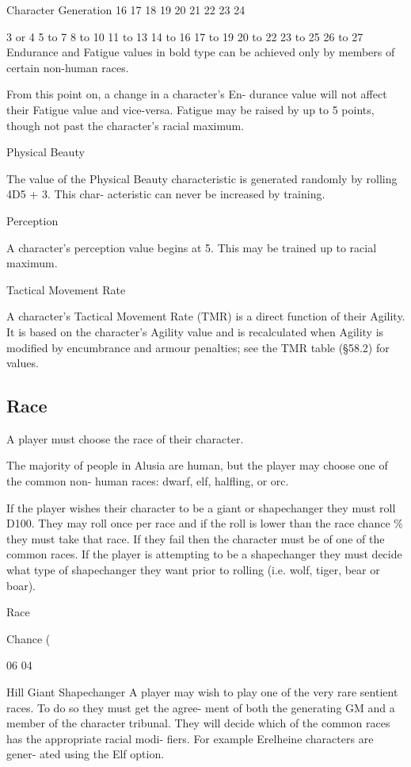 \begin{Chapter}{Character Generation}
16 
17 
18 
19 
20 
21 
22 
23 
24 

3 or 4 
5 to 7 
8 to 10 
11 to 13 
14 to 16 
17 to 19 
20 to 22 
23 to 25 
26 to 27 
Endurance  and  Fatigue  values  in  bold  type  can  be 
achieved  only  by  members  of  certain  non-human 
races. 

From  this  point  on,  a  change  in  a  character’s  En-
durance  value  will  not  affect  their  Fatigue  value 
and  vice-versa.  Fatigue  may  be  raised  by  up  to  5 
points,  though  not  past  the  character’s  racial 
maximum. 

Physical Beauty 

The  value  of  the  Physical  Beauty  characteristic  is 
generated randomly by rolling 4D5 + 3. This char-
acteristic can never be increased by training. 

Perception 

A  character’s  perception  value  begins  at  5.  This 
may be trained up to racial maximum. 

Tactical Movement Rate 

A character’s Tactical Movement Rate (TMR) is a 
direct  function  of  their  Agility.  It  is  based  on  the 
character’s  Agility  value  and  is  recalculated  when 
Agility  is  modified  by  encumbrance  and  armour 
penalties; see the TMR table (§58.2) for values. 

\subsection{Race}

A player must choose the race of their character.

The majority of people in Alusia are human, but the player may choose
one of the common non- human races: dwarf, elf, halfling, or orc.

If the player wishes their character to be a giant or shapechanger
they must roll D100.  They may roll once per race and if the roll is
lower than the race chance \% they must take that race. If they fail
then the character must be of one of the common races.  If the player
is attempting to be a shapechanger they must decide what type of
shapechanger they want prior to rolling (i.e. wolf, tiger, bear or
boar).

Race 

Chance (%

06 
04 

Hill Giant 
Shapechanger 
A  player  may  wish  to  play  one  of  the  very  rare 
sentient  races.  To  do  so  they  must  get  the  agree-
ment of both the generating GM and a member of 
the  character  tribunal.  They  will  decide  which  of 
the common races has the appropriate racial modi-
fiers.  For  example  Erelheine  characters  are  gener-
ated using the Elf option. 


\end{Chapter}
